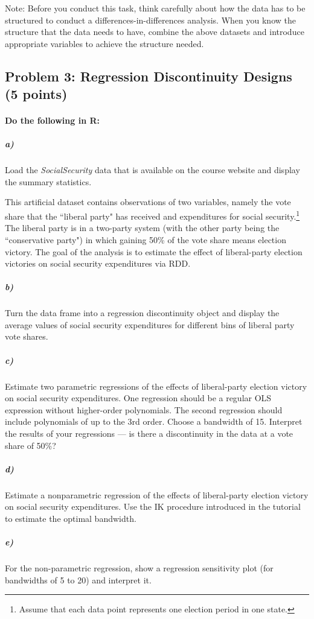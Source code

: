 \documentclass[12pt]{article}
\begin{document}
Note: Before you conduct this task, think carefully about how the data has to be structured to conduct a differences-in-differences analysis. When you know the structure that the data needs to have, combine the above datasets and introduce appropriate variables to achieve the structure needed.



\subsection*{Problem 3: Regression Discontinuity Designs (5 points)}

\paragraph{Do the following in R:}

\subparagraph{a)} Load the \textit{SocialSecurity} data that is available on the course website and display the summary statistics.

This artificial dataset contains observations of two variables, namely the vote share that the ``liberal party" has received and expenditures for social security.\footnote{Assume that each data point represents one election period in one state.} The liberal party is in a two-party system (with the other party being the ``conservative party") in which gaining 50\% of the vote share means election victory. The goal of the analysis is to estimate the effect of liberal-party election victories on social security expenditures via RDD.

\subparagraph{b)} Turn the data frame into a regression discontinuity object and display the average values of social security expenditures for different bins of liberal party vote shares.

\subparagraph{c)} Estimate two parametric regressions of the effects of liberal-party election victory on social security expenditures. One regression should be a regular OLS expression without higher-order polynomials. The second regression should include polynomials of up to the 3rd order. Choose a bandwidth of 15. Interpret the results of your regressions --- is there a discontinuity in the data at a vote share of 50\%?

\subparagraph{d)} Estimate a nonparametric regression of the effects of liberal-party election victory on social security expenditures. Use the IK procedure introduced in the tutorial to estimate the optimal bandwidth.

\subparagraph{e)} For the non-parametric regression, show a regression sensitivity plot (for bandwidths of 5 to 20) and interpret it.
\end{document}
